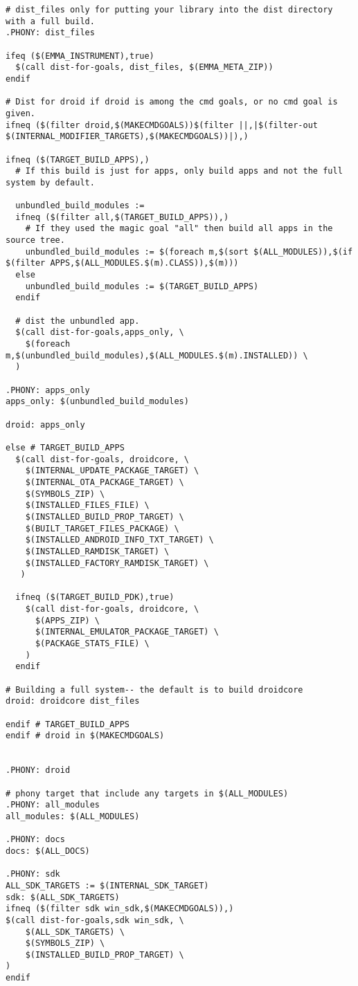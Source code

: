 \documentclass[12pt,a4paper]{article}
\begin{document}
\begin{verbatim}
# dist_files only for putting your library into the dist directory with a full build.
.PHONY: dist_files

ifeq ($(EMMA_INSTRUMENT),true)
  $(call dist-for-goals, dist_files, $(EMMA_META_ZIP))
endif

# Dist for droid if droid is among the cmd goals, or no cmd goal is given.
ifneq ($(filter droid,$(MAKECMDGOALS))$(filter ||,|$(filter-out $(INTERNAL_MODIFIER_TARGETS),$(MAKECMDGOALS))|),)

ifneq ($(TARGET_BUILD_APPS),)
  # If this build is just for apps, only build apps and not the full system by default.

  unbundled_build_modules :=
  ifneq ($(filter all,$(TARGET_BUILD_APPS)),)
    # If they used the magic goal "all" then build all apps in the source tree.
    unbundled_build_modules := $(foreach m,$(sort $(ALL_MODULES)),$(if $(filter APPS,$(ALL_MODULES.$(m).CLASS)),$(m)))
  else
    unbundled_build_modules := $(TARGET_BUILD_APPS)
  endif

  # dist the unbundled app.
  $(call dist-for-goals,apps_only, \
    $(foreach m,$(unbundled_build_modules),$(ALL_MODULES.$(m).INSTALLED)) \
  )

.PHONY: apps_only
apps_only: $(unbundled_build_modules)

droid: apps_only

else # TARGET_BUILD_APPS
  $(call dist-for-goals, droidcore, \
    $(INTERNAL_UPDATE_PACKAGE_TARGET) \
    $(INTERNAL_OTA_PACKAGE_TARGET) \
    $(SYMBOLS_ZIP) \
    $(INSTALLED_FILES_FILE) \
    $(INSTALLED_BUILD_PROP_TARGET) \
    $(BUILT_TARGET_FILES_PACKAGE) \
    $(INSTALLED_ANDROID_INFO_TXT_TARGET) \
    $(INSTALLED_RAMDISK_TARGET) \
    $(INSTALLED_FACTORY_RAMDISK_TARGET) \
   )

  ifneq ($(TARGET_BUILD_PDK),true)
    $(call dist-for-goals, droidcore, \
      $(APPS_ZIP) \
      $(INTERNAL_EMULATOR_PACKAGE_TARGET) \
      $(PACKAGE_STATS_FILE) \
    )
  endif

# Building a full system-- the default is to build droidcore
droid: droidcore dist_files

endif # TARGET_BUILD_APPS
endif # droid in $(MAKECMDGOALS)


.PHONY: droid

# phony target that include any targets in $(ALL_MODULES)
.PHONY: all_modules
all_modules: $(ALL_MODULES)

.PHONY: docs
docs: $(ALL_DOCS)

.PHONY: sdk
ALL_SDK_TARGETS := $(INTERNAL_SDK_TARGET)
sdk: $(ALL_SDK_TARGETS)
ifneq ($(filter sdk win_sdk,$(MAKECMDGOALS)),)
$(call dist-for-goals,sdk win_sdk, \
    $(ALL_SDK_TARGETS) \
    $(SYMBOLS_ZIP) \
    $(INSTALLED_BUILD_PROP_TARGET) \
)
endif


\end{verbatim}
\end{document}
